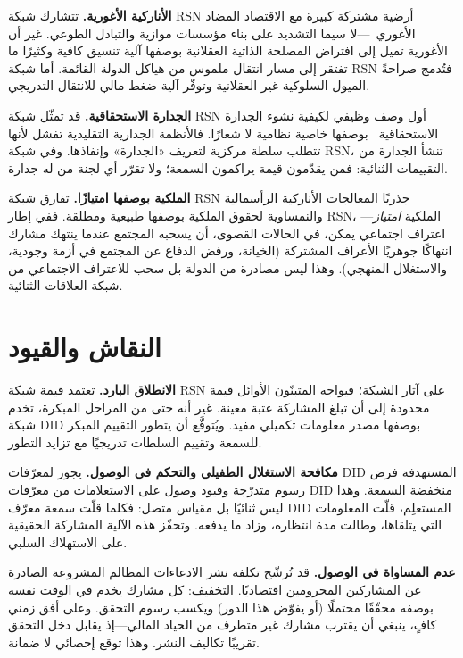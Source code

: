 \documentclass[11pt,a4paper,twocolumn]{article}
\begin{document}
\textbf{الأناركية الأغورية.} تتشارك شبكة RSN أرضية مشتركة كبيرة مع الاقتصاد المضاد الأغوري~\cite{konkin2006}---لا سيما التشديد على بناء مؤسسات موازية والتبادل الطوعي. غير أن الأغورية تميل إلى افتراض المصلحة الذاتية العقلانية بوصفها آلية تنسيق كافية وكثيرًا ما تفتقر إلى مسار انتقال ملموس من هياكل الدولة القائمة. أما شبكة RSN فتُدمج صراحةً الميول السلوكية غير العقلانية وتوفّر آلية ضغط مالي للانتقال التدريجي.

\textbf{الجدارة الاستحقاقية.} قد تمثّل شبكة RSN أول وصف وظيفي لكيفية نشوء الجدارة الاستحقاقية~\cite{young1958} بوصفها خاصية نظامية لا شعارًا. فالأنظمة الجدارية التقليدية تفشل لأنها تتطلب سلطة مركزية لتعريف «الجدارة» وإنفاذها. وفي شبكة RSN، تنشأ الجدارة من التقييمات الثنائية: فمن يقدّمون قيمة يراكمون السمعة؛ ولا تقرّر أي لجنة من له جدارة.

\textbf{الملكية بوصفها امتيازًا.} تفارق شبكة RSN جذريًا المعالجات الأناركية الرأسمالية والنمساوية لحقوق الملكية بوصفها طبيعية ومطلقة. ففي إطار RSN، الملكية \emph{امتياز}---اعتراف اجتماعي يمكن، في الحالات القصوى، أن يسحبه المجتمع عندما ينتهك مشارك انتهاكًا جوهريًا الأعراف المشتركة (الخيانة، ورفض الدفاع عن المجتمع في أزمة وجودية، والاستغلال المنهجي). وهذا ليس مصادرة من الدولة بل سحب للاعتراف الاجتماعي من شبكة العلاقات الثنائية.

\section{النقاش والقيود}

\textbf{الانطلاق البارد.} تعتمد قيمة شبكة RSN على آثار الشبكة؛ فيواجه المتبنّون الأوائل قيمة محدودة إلى أن تبلغ المشاركة عتبة معينة. غير أنه حتى من المراحل المبكرة، تخدم شبكة DID بوصفها مصدر معلومات تكميلي مفيد. ويُتوقَّع أن يتطور التقييم المبكر للسمعة وتقييم السلطات تدريجيًا مع تزايد التطور.

\textbf{مكافحة الاستغلال الطفيلي والتحكم في الوصول.} يجوز لمعرّفات DID المستهدفة فرض رسوم متدرّجة وقيود وصول على الاستعلامات من معرّفات DID منخفضة السمعة. وهذا ليس ثنائيًا بل مقياس متصل: فكلما قلّت سمعة معرّف DID المستعلِم، قلّت المعلومات التي يتلقاها، وطالت مدة انتظاره، وزاد ما يدفعه. وتحفّز هذه الآلية المشاركة الحقيقية على الاستهلاك السلبي.

\textbf{عدم المساواة في الوصول.} قد تُرشّح تكلفة نشر الادعاءات المظالم المشروعة الصادرة عن المشاركين المحرومين اقتصاديًا. التخفيف: كل مشارك يخدم في الوقت نفسه بوصفه محقّقًا محتملًا (أو يفوّض هذا الدور) ويكسب رسوم التحقق. وعلى أفق زمني كافٍ، ينبغي أن يقترب مشارك غير متطرف من الحياد المالي---إذ يقابل دخل التحقق تقريبًا تكاليف النشر. وهذا توقع إحصائي لا ضمانة.
\end{document}

